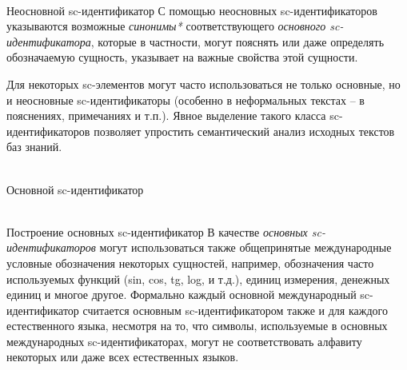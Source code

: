 \begin{frame}{\\Неосновной sc-идентификатор}
	\topline
	\justifying
	С помощью неосновных sc-идентификаторов указываются возможные \textit{синонимы*} соответствующего \textit{основного sc-идентификатора}, которые в частности, могут пояснять или даже определять обозначаемую сущность, указывает на важные свойства этой сущности.

	\bigskip
	Для некоторых sc-элементов могут часто использоваться не только основные, но и неосновные sc-идентификаторы (особенно в неформальных текстах -- в пояснениях, примечаниях и т.п.). Явное выделение такого класса sc-идентификаторов позволяет упростить семантический анализ исходных текстов баз знаний.
\end{frame}

\begin{frame}{\\Основной sc-идентификатор}
	\topline
	\justifying
	\begin{SCn}
		\begin{scnindent}
		\end{scnindent}
	\end{SCn}
	
\end{frame}

\begin{frame}{\\Построение основных sc-идентификатор}
	\topline
	\justifying
	В качестве \textit{основных sc-идентификаторов} могут использоваться также общепринятые международные условные обозначения некоторых сущностей, например, обозначения часто используемых функций (sin, cos, tg, log, и т.д.), единиц измерения, денежных единиц и многое другое. Формально каждый основной международный sc-идентификатор считается основным sc-идентификатором также и для каждого естественного языка, несмотря на то, что символы, используемые в основных международных sc-идентификаторах, могут не соответствовать алфавиту некоторых или даже всех естественных языков.
\end{frame}


